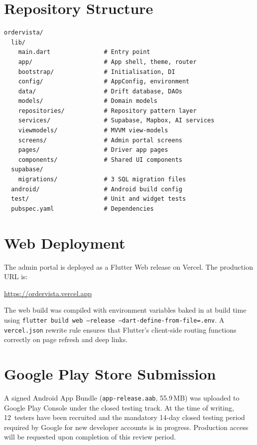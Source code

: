 \section{Repository Structure}

\begin{verbatim}
ordervista/
  lib/
    main.dart               # Entry point
    app/                    # App shell, theme, router
    bootstrap/              # Initialisation, DI
    config/                 # AppConfig, environment
    data/                   # Drift database, DAOs
    models/                 # Domain models
    repositories/           # Repository pattern layer
    services/               # Supabase, Mapbox, AI services
    viewmodels/             # MVVM view-models
    screens/                # Admin portal screens
    pages/                  # Driver app pages
    components/             # Shared UI components
  supabase/
    migrations/             # 3 SQL migration files
  android/                  # Android build config
  test/                     # Unit and widget tests
  pubspec.yaml              # Dependencies
\end{verbatim}

\section{Web Deployment}
\label{sec:web-deploy}

The admin portal is deployed as a Flutter Web release on Vercel.
The production URL is:

\begin{center}
\url{https://ordervista.vercel.app}
\end{center}

The web build was compiled with environment variables baked in at build time
using \texttt{flutter build web --release --dart-define-from-file=.env}.
A \texttt{vercel.json} rewrite rule ensures that Flutter's client-side
routing functions correctly on page refresh and deep links.

\section{Google Play Store Submission}
\label{sec:play-store}

A signed Android App Bundle (\texttt{app-release.aab}, 55.9\,MB) was uploaded
to Google Play Console under the closed testing track.  At the time of
writing, 12~testers have been recruited and the mandatory 14-day closed
testing period required by Google for new developer accounts is in progress.
Production access will be requested upon completion of this review period.

